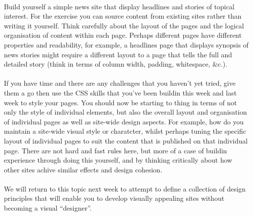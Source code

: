 \documentclass[10pt, a4paper]{article}
\begin{document}
\paragraph{} Build yourself a simple news site that display headlines and stories of topical interest. For the exercise you can source content from existing sites rather than writing it yourself. Think carefully about the layout of the pages and the logical organisation of content within each page. Perhaps different pages have different properties and readability, for example, a headlines page that displays synopsis of news stories might require a different layout to a page that tells the full and detailed story (think in terms of column width, padding, whitespace, \&c.).

\paragraph{} If you have time and there are any challenges that you haven't yet tried, give them a go then use the CSS skills that you've been buildin this week and last week to style your pages. You should now be starting to thing in terms of not only the style of individual elements, but also the overall layout and organisation of individual pages as well as site-wide design aspects. For example, how do you maintain a site-wide visual style or charatcter, whilst perhaps tuning the specific layout of individual pages to suit the content that is published on that individual page. There are not hard and fast rules here, but more of a case of buildin experience through doing this yourself, and by thinking critically about how other sites achive similar effects and design cohesion.

\paragraph{} We will return to this topic next week to attempt to define a collection of design principles that will enable you to develop visually appealing sites without becoming a visual ``designer''.
\end{document}
